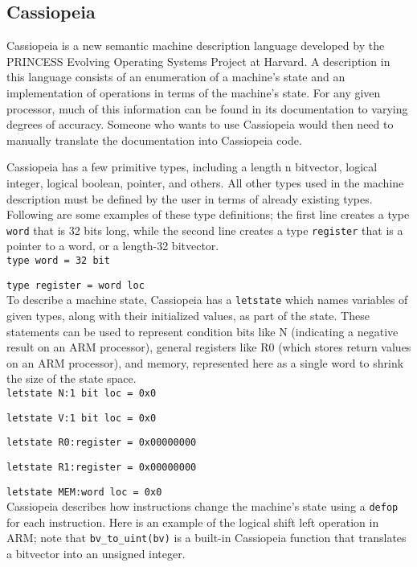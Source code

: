 \documentclass[letterpaper,12pt]{article}
\begin{document}
\subsection{Cassiopeia}

Cassiopeia is a new semantic machine description language developed by the PRINCESS Evolving Operating Systems Project at Harvard\cite{Princess}. A description in this language consists of an enumeration of a machine's state and an implementation of operations in terms of the machine's state. For any given processor, much of this information can be found in its documentation to varying degrees of accuracy. Someone who wants to use Cassiopeia would then need to manually translate the documentation into Cassiopeia code.

Cassiopeia has a few primitive types, including a length n bitvector, logical integer, logical boolean, pointer, and others. All other types used in the machine description must be defined by the user in terms of already existing types. Following are some examples of these type definitions; the first line creates a type \texttt{word} that is 32 bits long, while the second line creates a type \texttt{register} that is a pointer to a word, or a length-32 bitvector.\\

\texttt{type word = 32 bit}

\texttt{type register = word loc}\\

To describe a machine state, Cassiopeia has a \texttt{letstate} which names variables of given types, along with their initialized values, as part of the state. These statements can be used to represent condition bits like N (indicating a negative result on an ARM processor), general registers like R0 (which stores return values on an ARM processor), and memory, represented here as a single word to shrink the size of the state space.\\

\texttt{letstate N:1 bit loc = 0x0}

\texttt{letstate V:1 bit loc = 0x0}

\texttt{letstate R0:register = 0x00000000}

\texttt{letstate R1:register = 0x00000000}

\texttt{letstate MEM:word loc = 0x0}\\

Cassiopeia describes how instructions change the machine's state using a \texttt{defop} for each instruction.  Here is an example of the logical shift left operation in ARM; note that \texttt{bv\_to\_uint(bv)} is a built-in Cassiopeia function that translates a bitvector into an unsigned integer.\\
        
\end{document}
